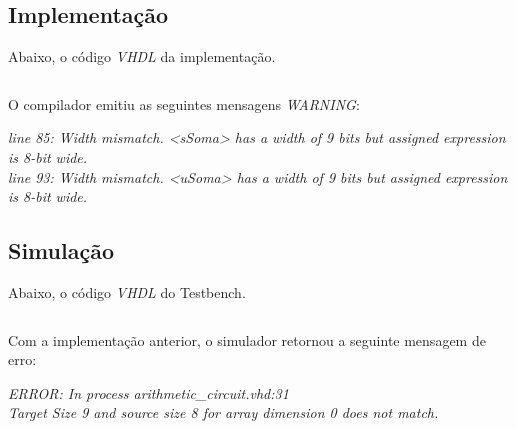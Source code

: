 \documentclass[12pt]{article}
\begin{document}
\subsection{Implementação}

Abaixo, o código \emph{VHDL} da implementação.

\inputminted{vhdl}{arithmetic_circuit.vhd}

O compilador emitiu as seguintes mensagens \emph{WARNING}:
\begin{center}
\emph{line 85: Width mismatch. <sSoma> has a width of 9 bits but assigned expression is 8-bit wide.}\\
\emph{line 93: Width mismatch. <uSoma> has a width of 9 bits but assigned expression is 8-bit wide.}
\end{center}

\subsection{Simulação}

Abaixo, o código \emph{VHDL} do Testbench.

\inputminted{vhdl}{arithmetic_circuit_tb.vhd}

Com a implementação anterior, o simulador retornou a seguinte mensagem de erro:
\begin{center}
\emph{ERROR: In process arithmetic\_circuit.vhd:31}\\
\emph{Target Size 9 and source size 8 for array dimension 0 does not match.}
\end{center}
\end{document}
